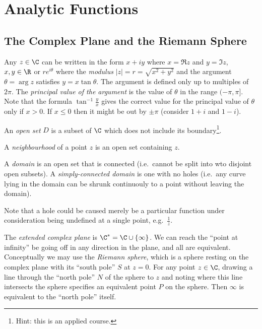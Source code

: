 \documentclass[a4paper]{article}
\begin{document}


\tableofcontents

\section{Analytic Functions}

\subsection{The Complex Plane and the Riemann Sphere}

Any \(z \in \C\) can be written in the form \(x + iy\) where \(x = \Re z\) and \(y = \Im z\), \(x, y \in \R\) or \(re^{i\theta}\) where the \emph{modulus} \(|z| = r = \sqrt{x^2 + y^2}\) and the argument \(\theta = \arg z\) satisfies \(y = x\tan \theta\). The argument is defined only up to multiples of \(2\pi\). The \emph{principal value of the argument} is the value of \(\theta\) in the range \((-\pi, \pi]\). Note that the formula \(\tan^{-1} \frac{y}{x}\) gives the correct value for the principal value of \(\theta\) only if \(x > 0\). If \(x \leq 0\) then it might be out by \(\pm \pi\) (consider \(1 + i\) and \(1 - i\)).

An \emph{open set} \(D\) is a subset of \(\C\) which does not include its boundary\footnote{Hint: this is an applied course.}.

A \emph{neighbourhood} of a point \(z\) is an open set containing \(z\).

A \emph{domain} is an open set that is connected (i.e.\ cannot be split into wto disjoint open subsets). A \emph{simply-connected domain} is one with no holes (i.e.\ any curve lying in the domain can be shrunk continuouly to a point without leaving the domain).

Note that a hole could be caused merely be a particular function under consideration being undefined at a single point, e.g.\ \(\frac{1}{z}\).

The \emph{extended complex plane} is \(\C^* = \C \cup \{\infty\}\). We can reach the ``point at infinity'' be going off in any direction in the plane, and all are equivalent. Conceptually we may use the \emph{Riemann sphere}, which is a sphere resting on the complex plane with its ``south pole'' \(S\) at \(z = 0\). For any point \(z \in \C\), drawing a line through the ``north pole'' \(N\) of the sphere to \(z\) and noting where this line intersects the sphere specifies an equivalent point \(P\) on the sphere. Then \(\infty\) is equivalent to the ``north pole'' itself.
\end{document}

